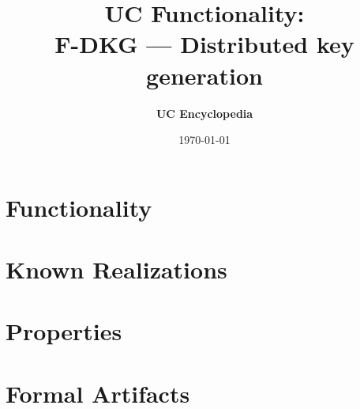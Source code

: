 \documentclass[11pt,a4paper]{article}
\title{\textbf{\Large UC Functionality:}\\[0.2em] \Large F-DKG --- Distributed key generation}
\author{\textbf{UC Encyclopedia}}
\date{\today}
\newtheorem{functionality}{Functionality}
\begin{document}
\maketitle

\begin{abstract}
\end{abstract}

\section{Functionality}

%

\section{Known Realizations}


\section{Properties}


\section{Formal Artifacts}

\end{document}
